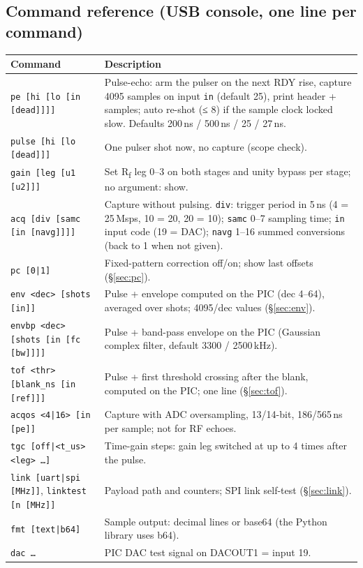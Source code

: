 \documentclass[10pt,a4paper]{article}
\newcommand{\cmd}[1]{\texttt{#1}}
\begin{document}
\subsection{Command reference (USB console, one line per command)}
\small
\begin{longtable}{@{}p{46mm}p{118mm}@{}}\toprule
\textbf{Command} & \textbf{Description}\\\midrule\endhead
\cmd{pe [hi [lo [in [dead]]]]} & Pulse-echo: arm the pulser on the next RDY rise, capture 4095 samples on input \cmd{in} (default 25), print header + samples; auto re-shot (≤ 8) if the sample clock locked slow. Defaults 200\,ns / 500\,ns / 25 / 27\,ns.\\
\cmd{pulse [hi [lo [dead]]]} & One pulser shot now, no capture (scope check).\\
\cmd{gain [leg [u1 [u2]]]} & Set R\textsubscript{f} leg 0–3 on both stages and unity bypass per stage; no argument: show.\\
\cmd{acq [div [samc [in [navg]]]]} & Capture without pulsing. \cmd{div}: trigger period in 5\,ns (4 = 25\,Msps, 10 = 20, 20 = 10); \cmd{samc} 0–7 sampling time; \cmd{in} input code (19 = DAC); \cmd{navg} 1–16 summed conversions (back to 1 when not given).\\
\cmd{pc [0|1]} & Fixed-pattern correction off/on; show last offsets (\S\ref{sec:pc}).\\
\cmd{env <dec> [shots [in]]} & Pulse + envelope computed on the PIC (dec 4–64), averaged over shots; 4095/dec values (\S\ref{sec:env}).\\
\cmd{envbp <dec> [shots [in [fc [bw]]]]} & Pulse + band-pass envelope on the PIC (Gaussian complex filter, default 3300 / 2500\,kHz).\\
\cmd{tof <thr> [blank\_ns [in [ref]]]} & Pulse + first threshold crossing after the blank, computed on the PIC; one line (\S\ref{sec:tof}).\\
\cmd{acqos <4|16> [in [pe]]} & Capture with ADC oversampling, 13/14-bit, 186/565\,ns per sample; not for RF echoes.\\
\cmd{tgc [off|<t\_us> <leg> …]} & Time-gain steps: gain leg switched at up to 4 times after the pulse.\\
\cmd{link [uart|spi [MHz]]}, \cmd{linktest [n [MHz]]} & Payload path and counters; SPI link self-test (\S\ref{sec:link}).\\
\cmd{fmt [text|b64]} & Sample output: decimal lines or base64 (the Python library uses b64).\\
\cmd{dac …} & PIC DAC test signal on DACOUT1 = input 19.\\

\end{longtable}
\end{document}

